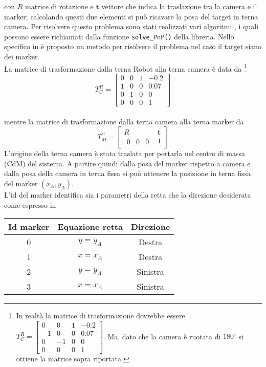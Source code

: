   con $R$ matrice di rotazione e $ \boldsymbol{t}$ vettore che indica la traslazione tra la camera e il marker; calcolando questi due elementi si può ricavare la 
  posa del target in terna camera. Per risolvere questo problema sono stati realizzati vari algoritmi \cite{marchand2015pose}, i quali possono essere richiamati dalla 
  funzione \texttt{solve\_PnP()} della libreria. Nello specifico in \cite{infinitesimal} è proposto un metodo per risolvere il problema nel caso il target siano dei
  marker. \\
  La matrice di trasformazione dalla terna Robot alla terna camera è data da \footnote{In realtà la matrice di trasformazione dovrebbe essere $T^R_C = \begin{bmatrix} 0 & 0 & 1 & -0.2 \\ -1 & 0 & 0 & 0.07 \\ 0 & -1 & 0 & 0 \\ 0 & 0 & 0 & 1 \end{bmatrix} $. Ma, dato che la camera è ruotata di $180^{\circ}$ si ottiene la matrice sopra riportata. }   
\begin{equation}
T^R_C = \begin{bmatrix} 0 & 0 & 1 & -0.2 \\ 1 & 0 & 0 & 0.07 \\ 0 & 1 & 0 & 0 \\ 0 & 0 & 0 & 1 \end{bmatrix} 
\end{equation}\\ mentre la matrice di trasformazione dalla terna camera alla terna marker da 
\begin{equation}
T^C_M = \begin{bmatrix} R & \boldsymbol{t} \\ \begin{matrix} 0 & 0  & 0 \end{matrix} & 1 \end{bmatrix}
\end{equation}
L'origine della terna camera è stata traslata per portarla nel centro di massa (CdM) del sistema.
A partire quindi dalla posa del marker rispetto a camera e dalla posa della camera in terna fissa si può ottenere la posizione in terna fissa del marker $(x_A, y_A)$.\\
L'id del marker identifica sia i parametri della retta che la direzione desiderata come espresso in 
  \begin{table} [H]
    \centering
    \begin{tabular}{|ccc|}
    \hline
        Id marker & Equazione retta & Direzione \\  \hline
        0 &  $ y = y_A$  & Destra   \\  \hline
        1 &  $ x= x_A $  & Destra\\  \hline
        2 &  $ y = y_A $ & Sinistra\\  \hline
        3 &  $ x = x_A $ & Sinistra\\  \hline
    \end{tabular}
\end{table}

